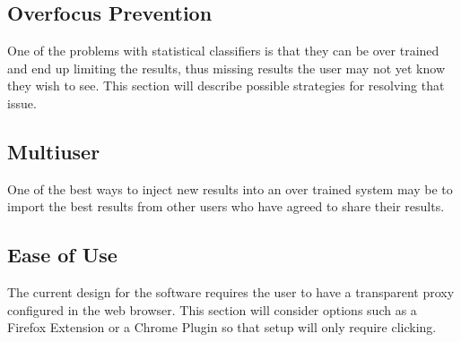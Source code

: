 \documentclass[12pt]{article}
\begin{document}
\subsection{Overfocus Prevention}
One of the problems with statistical classifiers is that they can be
over trained and end up limiting the results, thus missing results the
user may not yet know they wish to see.
This section will describe possible strategies for resolving that
issue.
\subsection{Multiuser}
One of the best ways to inject new results into an over trained system
may be to import the best results from other users who have agreed to
share their results.
\subsection{Ease of Use}
The current design for the software requires the user to have a
transparent proxy configured in the web browser.
This section will consider options such as a Firefox Extension or a
Chrome Plugin so that setup will only require clicking.
\pagebreak{}
 

\end{document}
